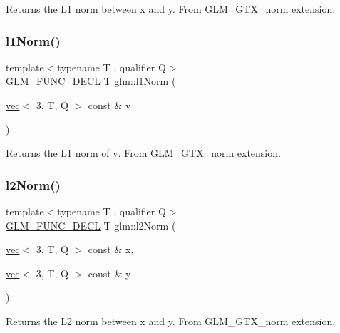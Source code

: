 Returns the L1 norm between x and y. From G\+L\+M\+\_\+\+G\+T\+X\+\_\+norm extension. \mbox{\label{group__gtx__norm_ga1a7491e2037ceeb37f83ce41addfc0be}} 
\subsubsection{\texorpdfstring{l1\+Norm()}{l1Norm()}\hspace{0.1cm}{\footnotesize\ttfamily [2/2]}}
{\footnotesize\ttfamily template$<$typename T , qualifier Q$>$ \\
\mbox{\hyperlink{setup_8hpp_ab2d052de21a70539923e9bcbf6e83a51}{G\+L\+M\+\_\+\+F\+U\+N\+C\+\_\+\+D\+E\+CL}} T glm\+::l1\+Norm (\begin{DoxyParamCaption}\item[{\mbox{\hyperlink{structglm_1_1vec}{vec}}$<$ 3, T, Q $>$ const \&}]{v }\end{DoxyParamCaption})}

Returns the L1 norm of v. From G\+L\+M\+\_\+\+G\+T\+X\+\_\+norm extension. \mbox{\label{group__gtx__norm_ga41340b2ef40a9307ab0f137181565168}} 
\subsubsection{\texorpdfstring{l2\+Norm()}{l2Norm()}\hspace{0.1cm}{\footnotesize\ttfamily [1/2]}}
{\footnotesize\ttfamily template$<$typename T , qualifier Q$>$ \\
\mbox{\hyperlink{setup_8hpp_ab2d052de21a70539923e9bcbf6e83a51}{G\+L\+M\+\_\+\+F\+U\+N\+C\+\_\+\+D\+E\+CL}} T glm\+::l2\+Norm (\begin{DoxyParamCaption}\item[{\mbox{\hyperlink{structglm_1_1vec}{vec}}$<$ 3, T, Q $>$ const \&}]{x,  }\item[{\mbox{\hyperlink{structglm_1_1vec}{vec}}$<$ 3, T, Q $>$ const \&}]{y }\end{DoxyParamCaption})}

Returns the L2 norm between x and y. From G\+L\+M\+\_\+\+G\+T\+X\+\_\+norm extension. \mbox{\label{group__gtx__norm_gae288bde8f0e41fb4ed62e65137b18cba}} 
